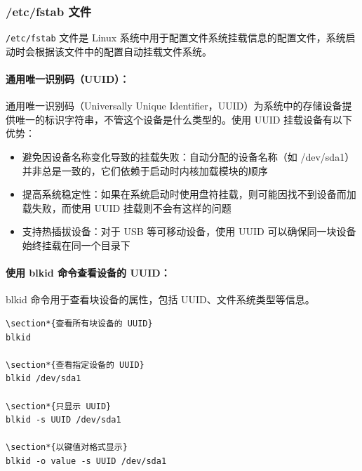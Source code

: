 \documentclass[12pt,UTF8]{ctexbook}
\begin{document}
\subsubsection{/etc/fstab 文件}
\texttt{/etc/fstab} 文件是 Linux 系统中用于配置文件系统挂载信息的配置文件，系统启动时会根据该文件中的配置自动挂载文件系统。

\paragraph{通用唯一识别码（UUID）：}
通用唯一识别码（Universally Unique Identifier，UUID）为系统中的存储设备提供唯一的标识字符串，不管这个设备是什么类型的。使用 UUID 挂载设备有以下优势：

\begin{itemize}
    \item 避免因设备名称变化导致的挂载失败：自动分配的设备名称（如 /dev/sda1）并非总是一致的，它们依赖于启动时内核加载模块的顺序
    \item 提高系统稳定性：如果在系统启动时使用盘符挂载，则可能因找不到设备而加载失败，而使用 UUID 挂载则不会有这样的问题
    \item 支持热插拔设备：对于 USB 等可移动设备，使用 UUID 可以确保同一块设备始终挂载在同一个目录下
\end{itemize}

\paragraph{使用 blkid 命令查看设备的 UUID：}
blkid 命令用于查看块设备的属性，包括 UUID、文件系统类型等信息。

\begin{verbatim}
\section*{查看所有块设备的 UUID}
blkid

\section*{查看指定设备的 UUID}
blkid /dev/sda1

\section*{只显示 UUID}
blkid -s UUID /dev/sda1

\section*{以键值对格式显示}
blkid -o value -s UUID /dev/sda1
\end{verbatim}
\end{document}
